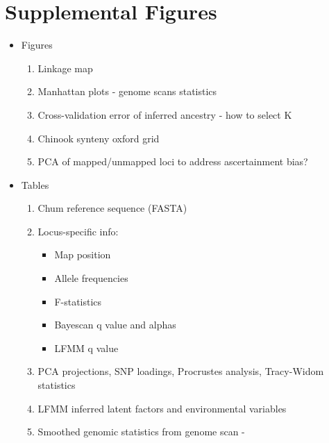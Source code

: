 \documentclass[12pt, one column]{article}
\begin{document}
\section*{Supplemental Figures}
\begin{itemize}
\item Figures
    	\begin{enumerate}
        \item Linkage map
        \item Manhattan plots - genome scans statistics
        \item Cross-validation error of inferred ancestry  - how to select K
        \item Chinook synteny oxford grid
        \item PCA of mapped/unmapped loci to address ascertainment bias?
		\end{enumerate}
\item Tables
    	\begin{enumerate}
        \item Chum reference sequence (FASTA)
        \item Locus-specific info: 
        	\begin{itemize}
            \item Map position
            \item Allele frequencies
            \item F-statistics
            \item Bayescan q value and alphas
            \item LFMM q value
            \end{itemize}
        \item PCA projections, SNP loadings, Procrustes analysis, Tracy-Widom statistics
        \item LFMM inferred latent factors and environmental variables
        \item Smoothed genomic statistics from genome scan - 
        \end{enumerate}
\end{itemize}
\end{document}

